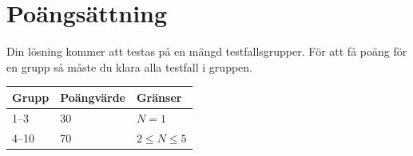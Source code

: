 \section*{Poängsättning}
Din lösning kommer att testas på en mängd testfallsgrupper. För att få poäng för en grupp
så måste du klara alla testfall i gruppen.

\begin{tabular}{| l | l | l |}
\hline
Grupp & Poängvärde & Gränser \\ \hline
1--3     & 30         & $N=1$ \\ 
4--10     & 70         & $2 \le N \le 5$ \\ \hline
\end{tabular}

